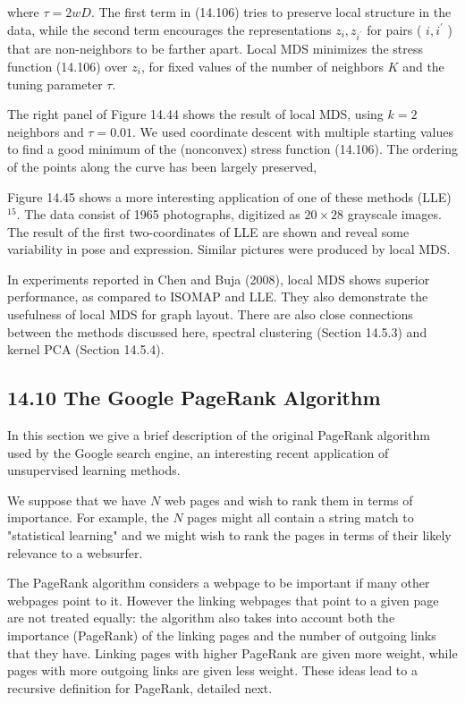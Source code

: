 \documentclass[10pt]{article}
\begin{document}
where $\tau=2 w D$. The first term in (14.106) tries to preserve local structure in the data, while the second term encourages the representations $z_{i}, z_{i^{\prime}}$ for pairs ( $i, i^{\prime}$ ) that are non-neighbors to be farther apart. Local MDS minimizes the stress function (14.106) over $z_{i}$, for fixed values of the number of neighbors $K$ and the tuning parameter $\tau$.

The right panel of Figure 14.44 shows the result of local MDS, using $k=2$ neighbors and $\tau=0.01$. We used coordinate descent with multiple starting values to find a good minimum of the (nonconvex) stress function (14.106). The ordering of the points along the curve has been largely preserved,

Figure 14.45 shows a more interesting application of one of these methods (LLE) ${ }^{15}$. The data consist of 1965 photographs, digitized as $20 \times 28$ grayscale images. The result of the first two-coordinates of LLE are shown and reveal some variability in pose and expression. Similar pictures were produced by local MDS.

In experiments reported in Chen and Buja (2008), local MDS shows superior performance, as compared to ISOMAP and LLE. They also demonstrate the usefulness of local MDS for graph layout. There are also close connections between the methods discussed here, spectral clustering (Section 14.5.3) and kernel PCA (Section 14.5.4).

\subsection*{14.10 The Google PageRank Algorithm}
In this section we give a brief description of the original PageRank algorithm used by the Google search engine, an interesting recent application of unsupervised learning methods.

We suppose that we have $N$ web pages and wish to rank them in terms of importance. For example, the $N$ pages might all contain a string match to "statistical learning" and we might wish to rank the pages in terms of their likely relevance to a websurfer.

The PageRank algorithm considers a webpage to be important if many other webpages point to it. However the linking webpages that point to a given page are not treated equally: the algorithm also takes into account both the importance (PageRank) of the linking pages and the number of outgoing links that they have. Linking pages with higher PageRank are given more weight, while pages with more outgoing links are given less weight. These ideas lead to a recursive definition for PageRank, detailed next.
\end{document}
